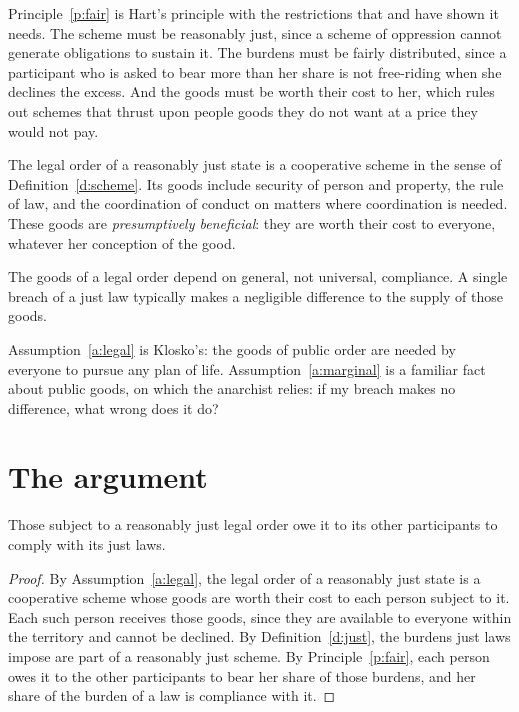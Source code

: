 \documentclass{situationist-preprint}
\begin{document}
Principle~\ref{p:fair} is Hart's principle with the restrictions that \citet{Klosko1992} and \citet{Arneson1982} have shown it needs. The scheme must be reasonably just, since a scheme of oppression cannot generate obligations to sustain it. The burdens must be fairly distributed, since a participant who is asked to bear more than her share is not free-riding when she declines the excess. And the goods must be worth their cost to her, which rules out schemes that thrust upon people goods they do not want at a price they would not pay.

\begin{assumption}\label{a:legal}
The legal order of a reasonably just state is a cooperative scheme in the sense of Definition~\ref{d:scheme}. Its goods include security of person and property, the rule of law, and the coordination of conduct on matters where coordination is needed. These goods are \emph{presumptively beneficial}: they are worth their cost to everyone, whatever her conception of the good.
\end{assumption}

\begin{assumption}[Marginality]\label{a:marginal}
The goods of a legal order depend on general, not universal, compliance. A single breach of a just law typically makes a negligible difference to the supply of those goods.
\end{assumption}

Assumption~\ref{a:legal} is Klosko's: the goods of public order are needed by everyone to pursue any plan of life. Assumption~\ref{a:marginal} is a familiar fact about public goods, on which the anarchist relies: if my breach makes no difference, what wrong does it do?

\section{The argument}

\begin{lemma}[Existence]\label{l:exist}
Those subject to a reasonably just legal order owe it to its other participants to comply with its just laws.
\end{lemma}

\begin{proof}
By Assumption~\ref{a:legal}, the legal order of a reasonably just state is a cooperative scheme whose goods are worth their cost to each person subject to it. Each such person receives those goods, since they are available to everyone within the territory and cannot be declined. By Definition~\ref{d:just}, the burdens just laws impose are part of a reasonably just scheme. By Principle~\ref{p:fair}, each person owes it to the other participants to bear her share of those burdens, and her share of the burden of a law is compliance with it.
\end{proof}
\end{document}
